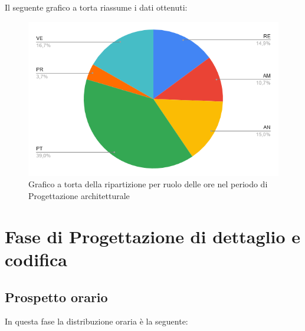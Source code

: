 {{{{{{Il seguente grafico a torta riassume i dati ottenuti:
\begin{figure}[!ht]
	\begin{center}
		\includegraphics[width=0.8\linewidth]{../immagini/pdp/torta_progettazione_architetturale.png}
		\caption{Grafico a torta della ripartizione per ruolo delle ore nel periodo di Progettazione
			architetturale}
	\end{center}
\end{figure}

\section{Fase di Progettazione di dettaglio e codifica}\label{PreventivoFaseDiProgettazioneDiDettaglioECodifica}

\subsection{Prospetto orario}\label{PreventivoFaseDiProgettazioneDiDettaglioECodificaProspettoOrario}
In questa fase la distribuzione oraria è la seguente:
\quad
\def\tabularxcolumn#1{m{#1}}
{
	
}}}}}}}
